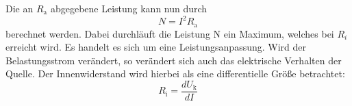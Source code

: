 Die an $R_\text{a}$ abgegebene Leistung kann nun durch 
\begin{equation}
	N = I^2R_\text{a}
\end{equation}
berechnet werden.
Dabei durchläuft die Leistung N ein Maximum, welches bei $R_i$ erreicht wird. Es handelt es sich um eine Leistungsanpassung. 
Wird der Belastungsstrom verändert, so verändert sich auch das elektrische Verhalten der Quelle. Der Innenwiderstand wird hierbei als eine differentielle Größe betrachtet:
\begin{equation}
	R_\text{i} = \frac{dU_\text{k}}{dI}
\end{equation}



















